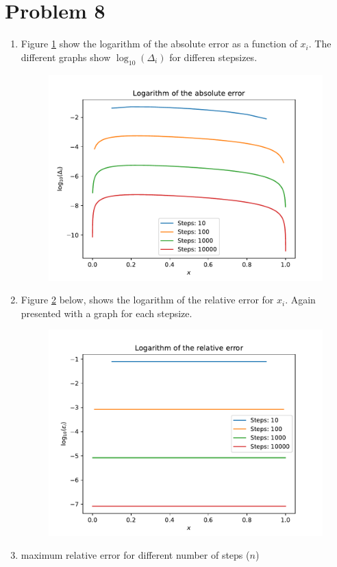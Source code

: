 \documentclass[english,notitlepage]{revtex4-1}  %
\begin{document}
\section*{Problem 8}
\begin{enumerate}[label= \alph*)]
  \item Figure \ref{fig:abs_error} show the logarithm of the absolute error as a function of $x_i$. The different graphs show $\log_{10}(\Delta_i)$ for differen stepsizes.
  \begin{figure}[H]
      \centering
      \includegraphics[width=.7\textwidth]{../figures/abs_error.pdf}
      \caption{}
      \label{fig:abs_error}
  \end{figure}
  \item Figure \ref{fig:rel_error} below, shows the logarithm of the relative error for $x_i$. Again presented with a graph for each stepsize.
  \begin{figure}[H]
    \centering
    \includegraphics[width=.7\textwidth]{../figures/rel_error.pdf}
    \caption{}
    \label{fig:rel_error}
  \end{figure}
  \item
  \begin{table}
    \caption{maximum relative error for different number of steps ($n$)}

\end{table}
\end{enumerate}
\end{document}
